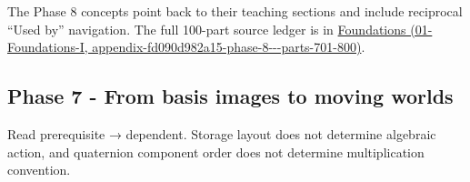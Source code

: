 The Phase 8 concepts point back to their teaching sections and include reciprocal ``Used by'' navigation. The full 100-part source ledger is in \href{../01-Foundations-I/main.pdf\#nameddest=appendix-fd090d982a15-phase-8---parts-701-800}{Foundations (01-Foundations-I, appendix-fd090d982a15-phase-8-\/-\/-parts-701-800)}.

\subsection{Phase 7 - From basis images to moving worlds}\label{appendix-4ad47bdd269a-phase-7---from-basis-images-to-moving-worlds}

Read prerequisite → dependent. Storage layout does not determine algebraic action, and quaternion component order does not determine multiplication convention.

